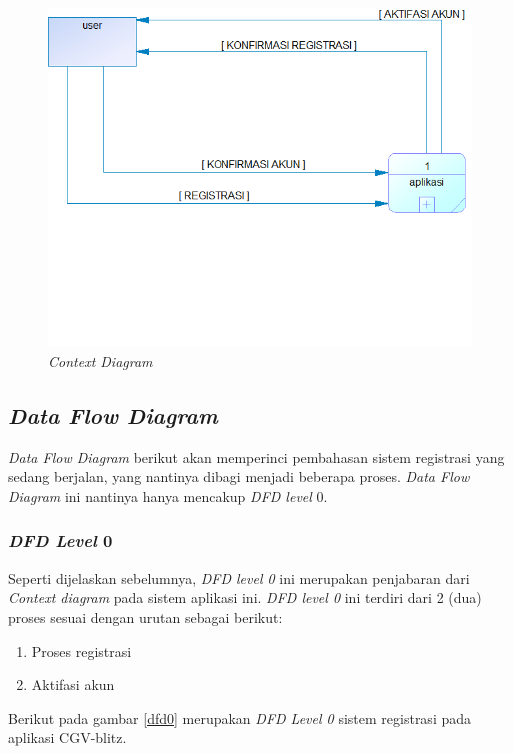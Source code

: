 \begin{figure}[!htbp]
    \centering
    \includegraphics[scale=0.6]{gambar/cd.png}
    \caption{\textit{Context Diagram}}
    \label{cd}
\end{figure}

\subsection{\textit{Data Flow Diagram}}
\par
\textit{Data Flow Diagram} berikut akan memperinci pembahasan sistem registrasi yang sedang berjalan, yang nantinya dibagi menjadi beberapa proses. \textit{Data Flow Diagram} ini nantinya hanya mencakup \textit{DFD level} 0. 

\subsubsection{\textit{DFD Level} 0}
\par
Seperti dijelaskan sebelumnya, \textit{DFD level 0} ini merupakan penjabaran dari \textit{Context diagram} pada sistem aplikasi ini. \textit{DFD level 0} ini terdiri dari 2 (dua) proses sesuai dengan urutan sebagai berikut:
\begin{enumerate}
\item Proses registrasi
\item Aktifasi akun
\end{enumerate}

\par
Berikut pada gambar \ref{dfd0} merupakan \textit{DFD Level 0} sistem registrasi pada aplikasi CGV-blitz.

